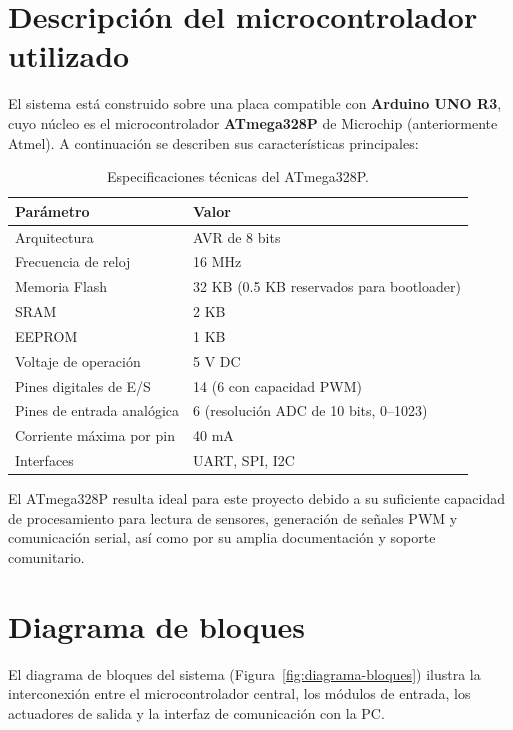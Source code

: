 \section{Descripción del microcontrolador utilizado}

El sistema está construido sobre una placa compatible con \textbf{Arduino UNO R3}, cuyo núcleo es el microcontrolador \textbf{ATmega328P} de Microchip (anteriormente Atmel). A continuación se describen sus características principales:

\begin{table}[H]
\centering
\caption{Especificaciones técnicas del ATmega328P.}
\label{tab:atmega328p}
\begin{tabular}{@{}ll@{}}
\toprule
\textbf{Parámetro} & \textbf{Valor} \\
\midrule
Arquitectura & AVR de 8 bits \\
Frecuencia de reloj & 16 MHz \\
Memoria Flash & 32 KB (0.5 KB reservados para bootloader) \\
SRAM & 2 KB \\
EEPROM & 1 KB \\
Voltaje de operación & 5 V DC \\
Pines digitales de E/S & 14 (6 con capacidad PWM) \\
Pines de entrada analógica & 6 (resolución ADC de 10 bits, 0--1023) \\
Corriente máxima por pin & 40 mA \\
Interfaces & UART, SPI, I2C \\
\bottomrule
\end{tabular}
\end{table}

El ATmega328P resulta ideal para este proyecto debido a su suficiente capacidad de procesamiento para lectura de sensores, generación de señales PWM y comunicación serial, así como por su amplia documentación y soporte comunitario.

\label{ch:hardware}

\section{Diagrama de bloques}

El diagrama de bloques del sistema (Figura~\ref{fig:diagrama-bloques}) ilustra la interconexión entre el microcontrolador central, los módulos de entrada, los actuadores de salida y la interfaz de comunicación con la PC.

